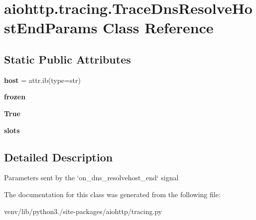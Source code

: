 \hypertarget{classaiohttp_1_1tracing_1_1_trace_dns_resolve_host_end_params}{}\section{aiohttp.\+tracing.\+Trace\+Dns\+Resolve\+Host\+End\+Params Class Reference}
\label{classaiohttp_1_1tracing_1_1_trace_dns_resolve_host_end_params}
\subsection*{Static Public Attributes}
\begin{DoxyCompactItemize}
\item 
\mbox{\label{classaiohttp_1_1tracing_1_1_trace_dns_resolve_host_end_params_a1095337d781cb89d7f87197bf3ad31dc}} 
{\bfseries host} = attr.\+ib(type=str)
\item 
\mbox{\label{classaiohttp_1_1tracing_1_1_trace_dns_resolve_host_end_params_a7f90ff4892d2d97078802fca76d62144}} 
{\bfseries frozen}
\item 
\mbox{\label{classaiohttp_1_1tracing_1_1_trace_dns_resolve_host_end_params_ab58c96daf4c5d0cd50ebf5da6a5bb6db}} 
{\bfseries True}
\item 
\mbox{\label{classaiohttp_1_1tracing_1_1_trace_dns_resolve_host_end_params_a2ced44e20d72508786790451ccc437ed}} 
{\bfseries slots}
\end{DoxyCompactItemize}


\subsection{Detailed Description}
\begin{DoxyVerb}Parameters sent by the `on_dns_resolvehost_end` signal\end{DoxyVerb}
 

The documentation for this class was generated from the following file\+:\begin{DoxyCompactItemize}
\item 
venv/lib/python3./site-\/packages/aiohttp/tracing.\+py\end{DoxyCompactItemize}

